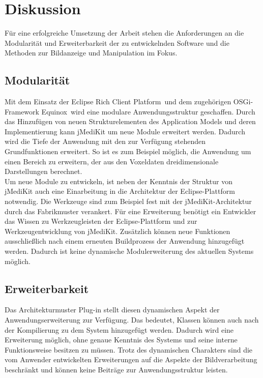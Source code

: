 \chapter{Diskussion}

Für eine erfolgreiche Umsetzung der Arbeit stehen die Anforderungen an die Modularität und Erweiterbarkeit der zu entwickelnden Software und die Methoden zur Bildanzeige und Manipulation im Fokus. 

\section*{Modularität}

Mit dem Einsatz der \glqq Eclipse Rich Client Platform\grqq\ und dem zugehörigen OSGi-Framework \glqq Equinox\grqq\ wird eine modulare Anwendungsstruktur geschaffen. Durch das Hinzufügen von neuen Strukturelementen des Application Models und deren Implementierung kann jMediKit um neue Module erweitert werden. Dadurch wird die Tiefe der Anwendung mit den zur Verfügung stehenden Grundfunktionen erweitert. So ist es zum Beispiel möglich, die Anwendung um einen Bereich zu erweitern, der aus den Voxeldaten dreidimensionale Darstellungen berechnet.\\
Um neue Module zu entwickeln, ist neben der Kenntnis der Struktur von jMediKit auch eine Einarbeitung in die Architektur der Eclipse-Plattform notwendig. Die Werkzeuge sind zum Beispiel fest mit der jMediKit-Architektur durch das Fabrikmuster verankert. Für eine Erweiterung benötigt ein Entwickler das Wissen zu Werkzeugleisten der Eclipse-Plattform und zur Werkzeugentwicklung von jMediKit. Zusätzlich können neue Funktionen ausschließlich nach einem erneuten Buildprozess der Anwendung hinzugefügt werden. Dadurch ist keine dynamische Modulerweiterung des aktuellen Systems möglich.

\section*{Erweiterbarkeit}
Das Architekturmuster Plug-in stellt diesen dynamischen Aspekt der Anwendungserweiterung zur Verfügung. Das bedeutet, Klassen können auch nach der Kompilierung zu dem System hinzugefügt werden. Dadurch wird eine Erweiterung möglich, ohne genaue Kenntnis des Systems und seine interne Funktionsweise besitzen zu müssen. Trotz des dynamischen Charakters sind die vom Anwender entwickelten Erweiterungen auf die Aspekte der Bildverarbeitung beschränkt und können keine Beiträge zur Anwendungsstruktur leisten.


